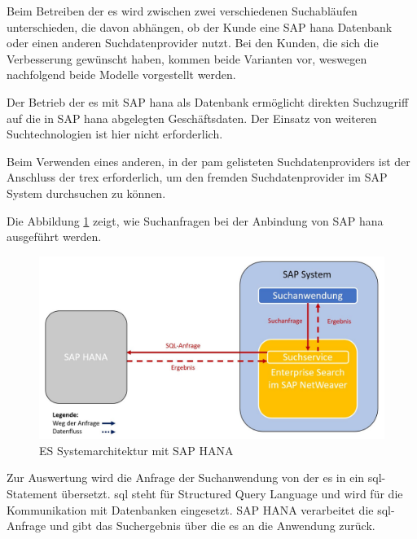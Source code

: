Beim Betreiben der \acl{es} wird zwischen zwei verschiedenen Suchabläufen unterschieden, die davon abhängen, ob der Kunde eine SAP \ac{hana} Datenbank oder einen anderen Suchdatenprovider nutzt. Bei den Kunden, die sich die Verbesserung gewünscht haben, kommen beide Varianten vor, weswegen nachfolgend beide Modelle vorgestellt werden.\autocite[Vgl.][]{ESV}

Der Betrieb der \acl{es} mit SAP \ac{hana} als Datenbank ermöglicht direkten Suchzugriff auf die in SAP \ac{hana} abgelegten Geschäftsdaten. Der Einsatz von weiteren Suchtechnologien ist hier nicht erforderlich.\autocite[Vgl.][]{ESV}

Beim Verwenden eines anderen, in der \ac{pam} gelisteten Suchdatenproviders ist der Anschluss der \ac{trex} erforderlich, um den fremden Suchdatenprovider im SAP System durchsuchen zu können.\autocite[Vgl.][]{ESV} 

Die Abbildung \ref{fig:ESHANA} zeigt, wie Suchanfragen bei der Anbindung von SAP \ac{hana} ausgeführt werden.


\begin{figure}[h]
    \centering
    \includegraphics[width=1\textwidth]{img/ES_HANAselbst.JPG}
    \caption[ES Systemarchitektur mit SAP HANA]{ES Systemarchitektur mit SAP HANA\autocite{ESHANA}}
    \label{fig:ESHANA}
\end{figure}

Zur Auswertung wird die Anfrage der Suchanwendung von der \ac{es} in ein \acs{sql}-Statement übersetzt.
\acs{sql} steht für Structured Query Language und wird für die Kommunikation mit Datenbanken eingesetzt. SAP HANA verarbeitet die \acs{sql}-Anfrage und gibt das Suchergebnis über die \ac{es} an die Anwendung zurück.\autocite[Vgl.][]{ESHANA}

